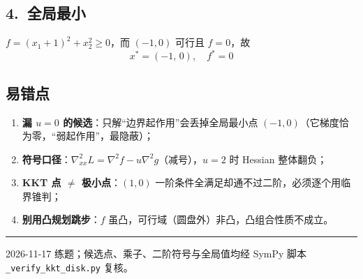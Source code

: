 \documentclass[11pt]{ctexart}
\begin{document}
\subsection*{4.\ 全局最小}

$f=(x_1+1)^2+x_2^2\ge 0$，而 $(-1,0)$ 可行且 $f=0$，故
\[
\boxed{x^*=(-1,\,0),\quad f^*=0}
\]

\subsection*{易错点}

\begin{enumerate}
\item \textbf{漏 $u=0$ 的候选}：只解``边界起作用''会丢掉全局最小点 $(-1,0)$（它梯度恰为零，``弱起作用''，最隐蔽）；
\item \textbf{符号口径}：$\nabla^2_{xx}L=\nabla^2 f-u\nabla^2 g$（减号），$u=2$ 时 Hessian 整体翻负；
\item \textbf{KKT 点 $\ne$ 极小点}：$(1,0)$ 一阶条件全满足却通不过二阶，必须逐个用临界锥判；
\item \textbf{别用凸规划跳步}：$f$ 虽凸，可行域（圆盘外）非凸，凸组合性质不成立。
\end{enumerate}

\vspace{8pt}
\hrule
\vspace{4pt}
{\small 2026-11-17 练题；候选点、乘子、二阶符号与全局值均经 SymPy 脚本 \texttt{\_verify\_kkt\_disk.py} 复核。}
\end{document}
